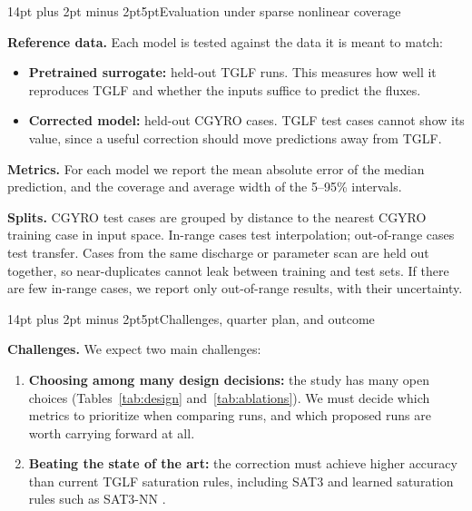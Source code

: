 \documentclass[10pt,letterpaper]{article}
\makeatletter
\renewcommand{\section}{\@startsection{section}{1}{0pt}
 {14pt plus 2pt minus 2pt}{5pt}{\normalfont\large\bfseries}}
\makeatother
\begin{document}
\section{Evaluation under sparse nonlinear coverage}
\label{sec:eval}

\textbf{Reference data.} Each model is tested against the data it is meant to match:
\begin{itemize}
      \item \textbf{Pretrained surrogate:} held-out TGLF runs. This measures how well it reproduces TGLF and whether the inputs suffice to predict the fluxes.
      \item \textbf{Corrected model:} held-out CGYRO cases. TGLF test cases cannot show its value, since a useful correction should move predictions away from TGLF.
\end{itemize}

\textbf{Metrics.} For each model we report the mean absolute error of the median prediction, and the coverage and average width of the 5--95\% intervals.

\textbf{Splits.} CGYRO test cases are grouped by distance to the nearest CGYRO training case in input space. In-range cases test interpolation; out-of-range cases test transfer. Cases from the same discharge or parameter scan are held out together, so near-duplicates cannot leak between training and test sets. If there are few in-range cases, we report only out-of-range results, with their uncertainty.

\FloatBarrier
\section{Challenges, quarter plan, and outcome}

\textbf{Challenges.} We expect two main challenges:
\begin{enumerate}
      \item \textbf{Choosing among many design decisions:} the study has many open choices (Tables~\ref{tab:design} and~\ref{tab:ablations}). We must decide which metrics to prioritize when comparing runs, and which proposed runs are worth carrying forward at all.
      \item \textbf{Beating the state of the art:} the correction must achieve higher accuracy than current TGLF saturation rules, including SAT3 \cite{dudding2022} and learned saturation rules such as SAT3-NN \cite{sar2026}.
\end{enumerate}
\end{document}
